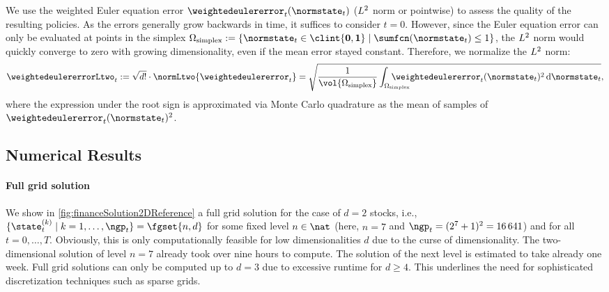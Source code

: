 We use the weighted Euler equation error
$\weightedeulererror_t(\normstate_t)$ ($L^2$ norm or pointwise)
to assess the quality of the resulting policies.
As the errors generally grow backwards in time,
it suffices to consider $t = 0$.
However, since the Euler equation error can only be evaluated at points in
the simplex
$
  \Omega_\mathrm{simplex}
  := \{\normstate_t \in \clint{\*0, \*1} \mid \sumfcn(\normstate_t) \le 1\}
$, the $L^2$ norm would
quickly converge to zero with growing dimensionality, even if the mean error
stayed constant.
Therefore, we normalize the $L^2$ norm:
\begin{equation}
  \weightedeulererrorLtwo_t
  := \sqrt{d!} \cdot \normLtwo{\weightedeulererror_t}
  = \sqrt{
    \frac{1}{\vol{\Omega_\mathrm{simplex}}}
    \int_{\mathrlap{\Omega_\mathrm{simplex}}\hphantom{\Omega}}
    \weightedeulererror_t(\normstate_t)^2 \diff{}\normstate_t
  },
\end{equation}
where the expression under the root sign is approximated
via Monte Carlo quadrature as the mean of samples
of $\weightedeulererror_t(\normstate_t)^2$.



\subsection{Numerical Results}
\label{sec:843results}

\paragraph{Full grid solution}

We show in \cref{fig:financeSolution2DReference}
a full grid solution for the case of $d = 2$ stocks,
i.e., $\{\state_t^{(k)} \mid k = 1, \dotsc, \ngp_t\} = \fgset{n,d}$
for some fixed level $n \in \nat$
(here, $n = 7$ and $\ngp_t = (2^7 + 1)^2 = \num{16641}$) and
for all $t = 0, \dotsc, T$.
Obviously, this is only computationally feasible
for low dimensionalities $d$ due to the curse of dimensionality.
The two-dimensional solution of level $n = 7$
already took over nine hours to compute.
The solution of the next level is estimated to take already one week.
Full grid solutions can only be computed up to $d = 3$
due to excessive runtime for $d \ge 4$.
This underlines the need for sophisticated
discretization techniques such as sparse grids.

